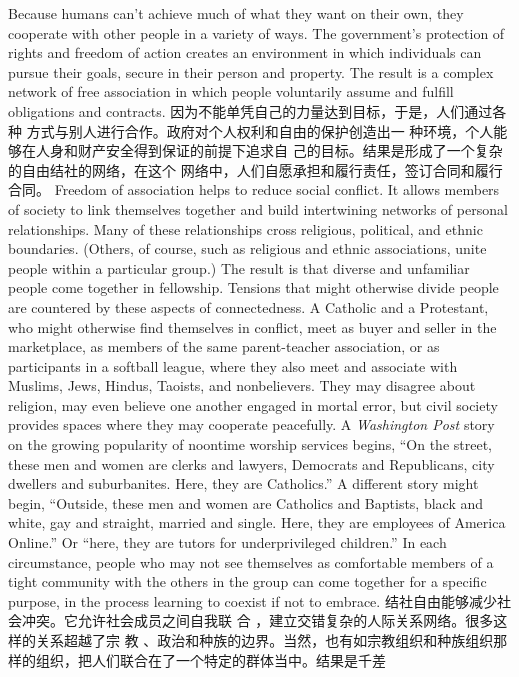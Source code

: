 \begin{paracol}{2}
Because humans can't achieve much of what they want on their
own, they cooperate with other people in a variety of ways. The
government's protection of rights and freedom of action creates
an environment in which individuals can pursue their goals, secure in their person and property. The result is a complex network of free association in which people voluntarily assume and
fulfill obligations and contracts.
\switchcolumn
因为不能单凭自己的力量达到目标，于是，人们通过各种
方式与别人进行合作。政府对个人权利和自由的保护创造出一
种环境，个人能够在人身和财产安全得到保证的前提下追求自
己的目标。结果是形成了一个复杂的自由结社的网络，在这个
网络中，人们自愿承担和履行责任，签订合同和履行合同。
\switchcolumn*
Freedom of association helps to reduce social conflict. It allows members of society to link themselves together and build
intertwining networks of personal relationships. Many of these
relationships cross religious, political, and ethnic boundaries.
(Others, of course, such as religious and ethnic associations,
unite people within a particular group.) The result is that diverse and unfamiliar people come together in fellowship. Tensions that might otherwise divide people are countered by these
aspects of connectedness. A Catholic and a Protestant, who
might otherwise find themselves in conflict, meet as buyer and
seller in the marketplace, as members of the same parent-teacher association, or as participants in a softball league, where
they also meet and associate with Muslims, Jews, Hindus,
Taoists, and nonbelievers. They may disagree about religion,
may even believe one another engaged in mortal error, but civil
society provides spaces where they may cooperate peacefully. A
\textit{Washington Post} story on the growing popularity of noontime
worship services begins, ``On the street, these men and women
are clerks and lawyers, Democrats and Republicans, city
dwellers and suburbanites. Here, they are Catholics.'' A different story might begin, ``Outside, these men and women are
Catholics and Baptists, black and white, gay and straight, married and single. Here, they are employees of America Online.''
Or ``here, they are tutors for underprivileged children.'' In each
circumstance, people who may not see themselves as comfortable members of a tight community with the others in the
group can come together for a specific purpose, in the process
learning to coexist if not to embrace.
\switchcolumn
结社自由能够减少社会冲突。它允许社会成员之间自我联
合 ，建立交错复杂的人际关系网络。很多这样的关系超越了宗
教 、政治和种族的边界。当然，也有如宗教组织和种族组织那
样的组织，把人们联合在了一个特定的群体当中。结果是千差

\end{paracol}

